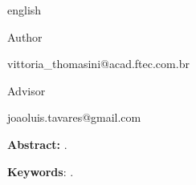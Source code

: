 \begin{Spacing}{1.0}
    \begin{otherlanguage*}{english}

\begin{center}
    \ABNTEXchapterfont\bfseries\large\imprimirtitulo
\end{center}
\hfill

\hspace*{0pt}\hfill \bfseries\normalsize \imprimirautor

\hspace*{0pt}\hfill \normalfont Author

\hspace*{0pt}\hfill \normalfont vittoria\_thomasini@acad.ftec.com.br

\hfill

\hspace*{0pt}\hfill 
{\bfseries\normalsize \imprimirorientador \par} 

\hspace*{0pt}\hfill \normalfont\normalsize Advisor

\hspace*{0pt}\hfill \normalfont joaoluis.tavares@gmail.com

\hfill

\hfill

\begin{resumo}[]
    
\textbf{Abstract:} .
\hfill

\textbf{Keywords}: . 
\end{resumo}
    \end{otherlanguage*}
\end{Spacing}\PRIVATEclearpageifneeded